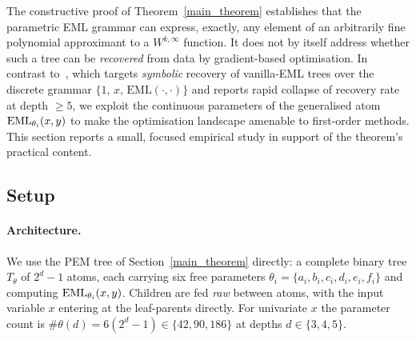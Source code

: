 
The constructive proof of Theorem~\ref{main_theorem} establishes that the
parametric EML grammar can express, exactly, any element of an arbitrarily
fine polynomial approximant to a $W^{k,\infty}$ function. It does not by
itself address whether such a tree can be \emph{recovered} from data by
gradient-based optimisation. In contrast to~\cite{eml}, which targets
\emph{symbolic} recovery of vanilla-EML trees over the discrete grammar
$\{1,\, x,\, \mathrm{EML}(\cdot,\cdot)\}$ and reports rapid collapse of
recovery rate at depth $\geq 5$, we exploit the continuous parameters of
the generalised atom $\operatorname{EML}_{\theta_i}({x}, {y})$ to make the optimisation landscape
amenable to first-order methods. This section reports a small, focused
empirical study in support of the theorem's practical content.

\subsection{Setup}
\label{sec:impl:setup}

\paragraph{Architecture.}
We use the PEM tree of Section~\ref{main_theorem} directly: a complete
binary tree $T_\theta$ of $2^d - 1$ atoms, each carrying six free parameters
$\theta_i = \{a_i, b_i, c_i, d_i, e_i, f_i\}$ and computing
$\operatorname{EML}_{\theta_i}({x}, {y})$. Children are fed \emph{raw} between atoms, with the
input variable $x$ entering at the leaf-parents directly. For univariate
$x$ the parameter count is $\#\theta(d) = 6(2^d - 1) \in \{42, 90, 186\}$
at depths $d \in \{3, 4, 5\}$.

